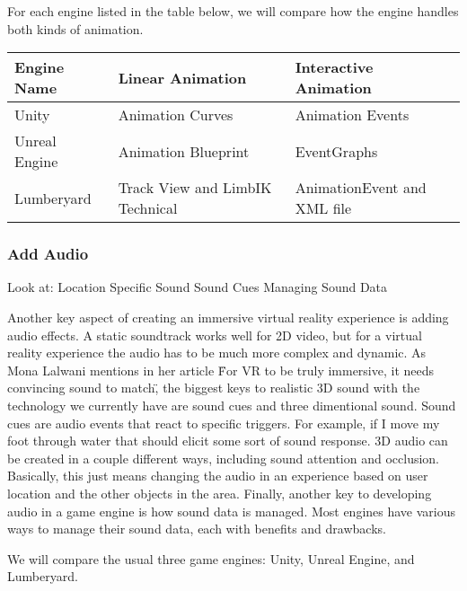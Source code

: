\documentclass[10pt,journal,compsoc,onecolumn, draftclsnofoot]{IEEEtran}
\begin{document}
For each engine listed in the table below, we will compare how the engine handles both kinds of animation.

\vspace{2mm}
\begin{table}[h!]
\centering
  \begin{tabu} to 1.0\textwidth { | X[l] || X[c] | X[c] |  }
  \hline
  Engine Name & Linear Animation & Interactive Animation\\
  \hline
  Unity  & Animation Curves & Animation Events\\
  Unreal Engine & Animation Blueprint & EventGraphs\\
  Lumberyard & Track View and LimbIK Technical & AnimationEvent and XML file\\
  \hline
  \end{tabu}
\end{table}
\vspace{2mm}

\subsubsection{Add Audio}
Look at:
Location Specific Sound
Sound Cues
Managing Sound Data

Another key aspect of creating an immersive virtual reality experience is adding audio effects.
A static soundtrack works well for 2D video, but for a virtual reality experience the audio has to be much more complex and dynamic.
As Mona Lalwani mentions in her article \"For VR to be truly immersive, it needs convincing sound to match\", the biggest keys to realistic 3D sound with the technology we currently have are sound cues and three dimentional sound. \cite{engadget_immersive_sound}
Sound cues are audio events that react to specific triggers.  For example, if I move my foot through water that should elicit some sort of sound response.
3D audio can be created in a couple different ways, including sound attention and occlusion.
Basically, this just means changing the audio in an experience based on user location and the other objects in the area.
Finally, another key to developing audio in a game engine is how sound data is managed.  Most engines have various ways to manage their sound data, each with benefits and drawbacks.

We will compare the usual three game engines: Unity, Unreal Engine, and Lumberyard.
\end{document}

